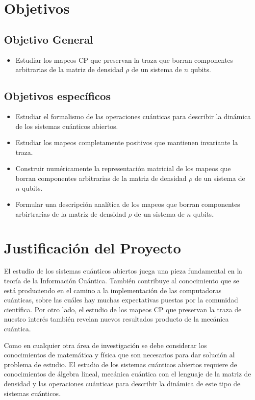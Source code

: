 \documentclass[11pt, spanish, letterpage]{article}
\newcounter{problem}[section]
\begin{document}
\section{Objetivos}
\subsection{Objetivo General}
\begin{itemize}
	\item Estudiar los mapeos CP que preservan la traza que borran componentes arbitrarias de la matriz de densidad $\rho$ de un sistema de $n$ qubits. 	
\end{itemize}

\subsection{Objetivos específicos}
\begin{itemize}
	\item Estudiar el formalismo de las operaciones cuánticas para describir la dinámica de los sistemas cuánticos abiertos.  
	\item Estudiar los mapeos completamente positivos que mantienen invariante la traza.  
	\item Construir numéricamente la representación matricial de los mapeos que borran componentes arbitrarias de la matriz de densidad $\rho$ de un sistema de $n$ qubits. 
	\item Formular una descripción analítica de los mapeos que borran componentes arbirtrarias de la matriz de densidad $\rho$ de un sistema de $n$ qubits.
\end{itemize}

\section{Justificación del Proyecto}
El estudio de los sistemas cuánticos abiertos juega una pieza fundamental en la teoría de la Información Cuántica. También contribuye al conocimiento que se está produciendo en el camino a la implementación de las computadoras cuánticas, sobre las cuáles hay muchas expectativas puestas por la comunidad científica. Por otro lado, el estudio de los mapeos CP que preservan la traza de nuestro interés también revelan nuevos resultados producto de la mecánica cuántica.   

Como en cualquier otra área de investigación se debe considerar los conocimientos de matemática y física que son necesarios para dar solución al problema de estudio. El estudio de los sistemas cuánticos abiertos requiere de conocimientos de álgebra lineal, mecánica cuántica con el lenguaje de la matriz de densidad y las operaciones cuánticas para describir la dinámica de este tipo de sistemas cuánticos.
\end{document}
